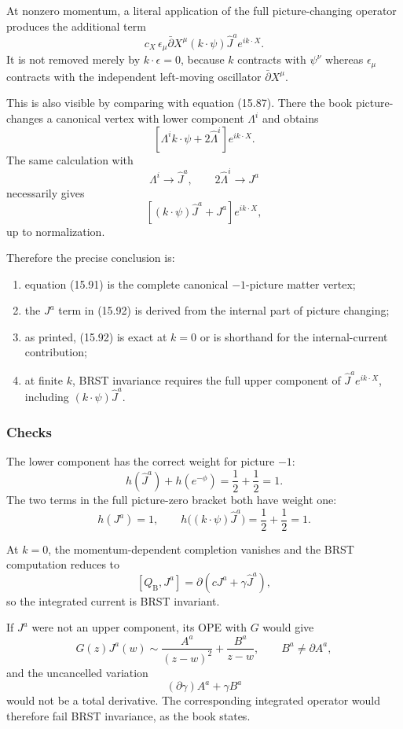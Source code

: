\documentclass[
  10pt,
  a4paper,
  openany]{book}
\providecommand{\tightlist}{%
  \setlength{\itemsep}{0pt}\setlength{\parskip}{0pt}}
\begin{document}
At nonzero momentum, a literal application of the full picture-changing
operator produces the additional term \[
c_X\,
\epsilon_\mu\bar\partial X^\mu
(k\cdot\psi)\hat J^a e^{ik\cdot X}.
\] It is not removed merely by \(k\cdot\epsilon=0\), because \(k\)
contracts with \(\psi^\nu\) whereas \(\epsilon_\mu\) contracts with the
independent left-moving oscillator \(\bar\partial X^\mu\).

This is also visible by comparing with equation (15.87). There the book
picture-changes a canonical vertex with lower component \(\Lambda^i\)
and obtains \[
\left[
\Lambda^i k\cdot\psi
+2\hat\Lambda^i
\right]e^{ik\cdot X}.
\] The same calculation with \[
\Lambda^i\longrightarrow\hat J^a,
\qquad
2\hat\Lambda^i\longrightarrow J^a
\] necessarily gives \[
\left[
(k\cdot\psi)\hat J^a
+J^a
\right]e^{ik\cdot X},
\] up to normalization.

Therefore the precise conclusion is:

\begin{enumerate}
\def\labelenumi{\arabic{enumi}.}
\tightlist
\item
  equation (15.91) is the complete canonical \(-1\)-picture matter
  vertex;
\item
  the \(J^a\) term in (15.92) is derived from the internal part of
  picture changing;
\item
  as printed, (15.92) is exact at \(k=0\) or is shorthand for the
  internal-current contribution;
\item
  at finite \(k\), BRST invariance requires the full upper component of
  \(\hat J^a e^{ik\cdot X}\), including \((k\cdot\psi)\hat J^a\).
\end{enumerate}

\subsubsection{Checks}\label{checks-25}

The lower component has the correct weight for picture \(-1\): \[
h(\hat J^a)+h(e^{-\phi})
=
\frac12+\frac12
=1.
\] The two terms in the full picture-zero bracket both have weight one:
\[
h(J^a)=1,
\qquad
h\bigl((k\cdot\psi)\hat J^a\bigr)
=
\frac12+\frac12
=1.
\]

At \(k=0\), the momentum-dependent completion vanishes and the BRST
computation reduces to \[
[Q_{\mathrm B},J^a]
=
\partial(cJ^a+\gamma\hat J^a),
\] so the integrated current is BRST invariant.

If \(J^a\) were not an upper component, its OPE with \(G\) would give \[
G(z)J^a(w)
\sim
\frac{A^a}{(z-w)^2}
+
\frac{B^a}{z-w},
\qquad
B^a\neq\partial A^a,
\] and the uncancelled variation \[
(\partial\gamma)A^a+\gamma B^a
\] would not be a total derivative. The corresponding integrated
operator would therefore fail BRST invariance, as the book states.
\end{document}
